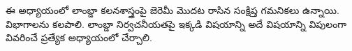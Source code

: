 \documentclass[../../../include/open-logic-chapter]{subfiles}
\begin{document}

\begin{editorial}
ఈ అధ్యాయంలో లాంబ్డా కలనశాస్త్రంపై జెరెమీ మొదట రాసిన సంక్షిప్త గమనికలు
ఉన్నాయి. విభాగాలను కలపాలి. లాంబ్డా నిర్వచనీయతపై ఇక్కడి విషయాన్ని అదే
విషయాన్ని విపులంగా వివరించే ప్రత్యేక అధ్యాయంలో చేర్చాలి.
\end{editorial}














\OLEndChapterHook
\end{document}
